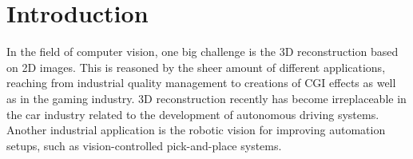 \documentclass  [
  paper    = a4,
  BCOR     = 10mm,
  twoside,
  fontsize = 12pt,
  fleqn,
  toc      = bibnumbered,
  toc      = listofnumbered,
  numbers  = noendperiod,
  headings = normal,
  listof   = leveldown,
  version  = 3.03
]                                       {scrreprt}
\begin{document}
  

  \tableofcontents


\chapter{Introduction}
In the field of computer vision, one big challenge is the 3D reconstruction based on 2D images. This is reasoned by the sheer amount of different applications, reaching from industrial quality management to creations of CGI effects as well as in the gaming industry. 3D reconstruction recently has become irreplaceable in the car industry related to the development of autonomous driving systems. Another industrial application is the robotic vision for improving automation setups, such as vision-controlled pick-and-place systems.\\
\end{document}
